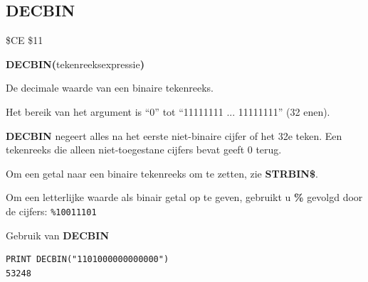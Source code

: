 \subsection{DECBIN}
\begin{description}[leftmargin=2cm,style=nextline]
\item [Token:]    \$CE \$11

\item [Formaat:]   {\bf DECBIN(}tekenreeksexpressie{\bf)}

\item [Retourneert:]  De decimale waarde van een binaire tekenreeks.

                  Het bereik van het argument is ``0'' tot ``11111111 ... 11111111'' (32 enen).

\item [Opmerkingen:]  {\bf DECBIN} negeert alles na het eerste niet-binaire cijfer of het 32e teken. Een tekenreeks die alleen niet-toegestane cijfers bevat geeft 0 terug.

                  Om een getal naar een binaire tekenreeks om te zetten, zie {\bf STRBIN\$}.

                  Om een letterlijke waarde als binair getal op te geven, gebruikt u {\bf \%} gevolgd door de cijfers: \texttt{\%10011101}

\item [Voorbeeld:]  Gebruik van {\bf DECBIN}

\begin{tcolorbox}[colback=black,coltext=white]
\verbatimfont{\codefont}
\begin{verbatim}
PRINT DECBIN("1101000000000000")
53248
\end{verbatim}
\end{tcolorbox}
\end{description}


\newpage
